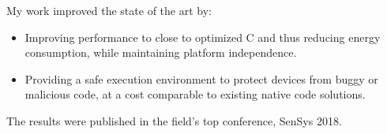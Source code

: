 \documentclass[10pt,a4paper]{altacv}
\begin{document}
My work improved the state of the art by:
\begin{itemize}
    \item\small{Improving performance to close to optimized C and thus reducing energy consumption, while maintaining platform independence.}
    \item\small{Providing a safe execution environment to protect devices from buggy or malicious code, at a cost comparable to existing native code solutions.}
\end{itemize}

The results were published in the field's top conference, SenSys 2018.

\medskip


\medskip
\end{document}
